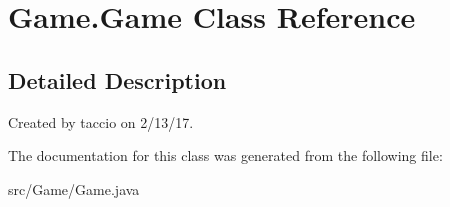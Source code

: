 \hypertarget{classGame_1_1Game}{\section{Game.\-Game Class Reference}
\label{classGame_1_1Game}
}


\subsection{Detailed Description}
Created by taccio on 2/13/17. 

The documentation for this class was generated from the following file\-:\begin{DoxyCompactItemize}
\item 
src/\-Game/Game.\-java\end{DoxyCompactItemize}
